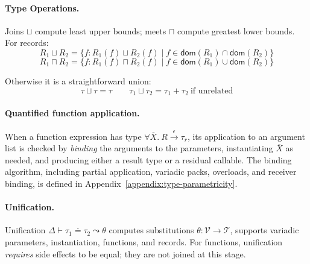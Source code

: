 \paragraph{Type Operations.}  
Joins $\sqcup$ compute least upper bounds; meets $\sqcap$ compute greatest lower bounds.  
For records:  
\[
R_1 \sqcup R_2 = \{f : R_1(f) \sqcup R_2(f) \mid f \in \mathsf{dom}(R_1) \cap \mathsf{dom}(R_2)\}
\]
\[
R_1 \sqcap R_2 = \{f : R_1(f) \sqcap R_2(f) \mid f \in \mathsf{dom}(R_1) \cup \mathsf{dom}(R_2)\}
\]

Otherwise it is a straightforward union:
\[
\tau \sqcup \tau = \tau
\quad\quad
\tau_1 \sqcup \tau_2 = \tau_1 + \tau_2 \ \text{if unrelated}
\]

\paragraph{Quantified function application.}
When a function expression has type $\forall\overline{X}.~R \xrightarrow{\epsilon} \tau_r$,
its application to an argument list is checked by \emph{binding} the arguments to the
parameters, instantiating $\overline{X}$ as needed, and producing either a result type
or a residual callable. The binding algorithm, including partial application,
variadic packs, overloads, and receiver binding, is defined in
Appendix~\ref{appendix:type-parametricity}.

\paragraph{Unification.}  
Unification $\Delta \vdash \tau_1 \doteq \tau_2 \leadsto \theta$ computes substitutions $\theta : \mathcal{V} \to \mathcal{T}$, supports variadic parameters, instantiation, functions, and records.  
For functions, unification \emph{requires} side effects to be equal; they are not joined at this stage.

